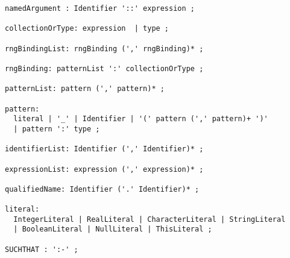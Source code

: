 {\begin{verbatim}
namedArgument : Identifier '::' expression ;

collectionOrType: expression  | type ;

rngBindingList: rngBinding (',' rngBinding)* ;

rngBinding: patternList ':' collectionOrType ;

patternList: pattern (',' pattern)* ;

pattern:
  literal | '_' | Identifier | '(' pattern (',' pattern)+ ')'
  | pattern ':' type ;
  
identifierList: Identifier (',' Identifier)* ;

expressionList: expression (',' expression)* ;
    
qualifiedName: Identifier ('.' Identifier)* ;

literal:
  IntegerLiteral | RealLiteral | CharacterLiteral | StringLiteral
  | BooleanLiteral | NullLiteral | ThisLiteral ;

SUCHTHAT : ':-' ;

\end{verbatim}
}

